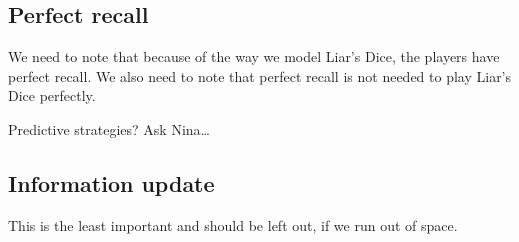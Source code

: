 \subsection{Perfect recall}

{ \color{red} We need to note that because of the way we model Liar's Dice, the players have perfect recall. We also need to note that perfect recall is not needed to play Liar's Dice perfectly. }

{ \color{red} Predictive strategies? Ask Nina\dots }

\subsection{Information update}

{ \color{red} This is the least important and should be left out, if we run out of space. }